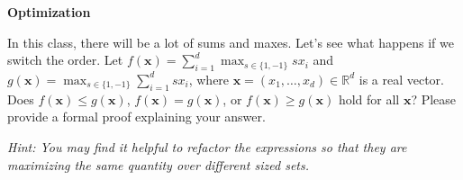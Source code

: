 \item {} {\bf Optimization}

In this class, there will be a lot of sums and maxes. Let's see what happens if
we switch the order. Let
$f(\mathbf x) = \sum_{i=1}^d \max_{s \in \{1,-1\}} s x_i$
and $g(\mathbf x) = \max_{s \in \{1,-1\}} \sum_{i=1}^d s x_i$, where
$\mathbf x = (x_1, \dots, x_d) \in \mathbb{R}^d$ is a real vector. Does $f(\mathbf x) \le g(\mathbf x)$, $f(\mathbf x) = g(\mathbf x)$, or $f(\mathbf x) \ge g(\mathbf x)$ hold for all $\mathbf x$?
Please provide a formal proof explaining your answer.

{\em Hint: You may find it helpful to refactor the expressions so that they
are maximizing the same quantity over different sized sets.}
